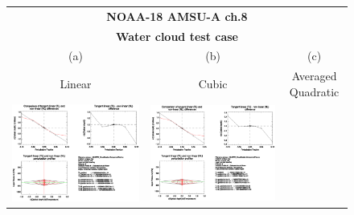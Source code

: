 \begin{figure}[htp]
  \centering
  \begin{tabular}{c c c}
    \multicolumn{3}{c}{\qquad\sffamily\textbf{NOAA-18 AMSU-A ch.8}}\\
    \multicolumn{3}{c}{\qquad\sffamily\textbf{Water cloud test case}}\\
    \qquad\textsf{(a)} & \qquad\textsf{(b)}  & \qquad\textsf{(c)} \\
    \qquad\textsf{Linear} & \qquad\textsf{Cubic}  & \qquad\textsf{Averaged Quadratic} \\
    \includegraphics[bb=90 400 300 540,clip,scale=0.7]{graphics/Cloud/TL/amsua_n18.ch8.WATER.NLIN.dOd_dT.eps} &
    \includegraphics[bb=90 400 300 540,clip,scale=0.7]{graphics/Cloud/TL/amsua_n18.ch8.WATER.NCUBIC.dOd_dT.eps}  &

\end{tabular}
\end{figure}
